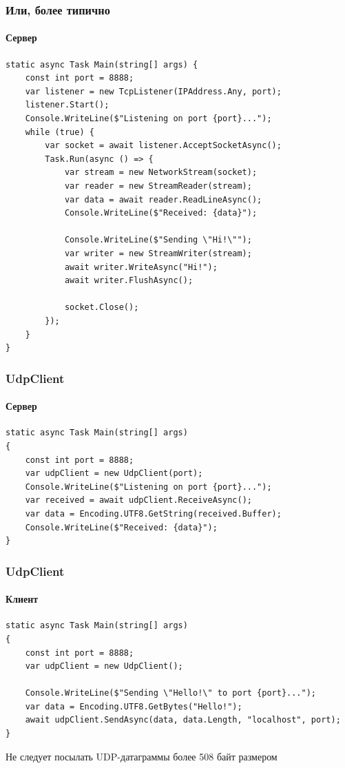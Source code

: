 \documentclass[xetex,mathserif,serif]{beamer}
\begin{document}
	\begin{frame}[fragile]
		\frametitle{Или, более типично}
		\framesubtitle{Сервер}
		\begin{scriptsize}
			\begin{verbatim}
static async Task Main(string[] args) {
    const int port = 8888;
    var listener = new TcpListener(IPAddress.Any, port);
    listener.Start();
    Console.WriteLine($"Listening on port {port}...");
    while (true) {
        var socket = await listener.AcceptSocketAsync();
        Task.Run(async () => {
            var stream = new NetworkStream(socket);
            var reader = new StreamReader(stream);
            var data = await reader.ReadLineAsync();
            Console.WriteLine($"Received: {data}");

            Console.WriteLine($"Sending \"Hi!\"");
            var writer = new StreamWriter(stream);
            await writer.WriteAsync("Hi!");
            await writer.FlushAsync();

            socket.Close();
        });
    }
}
			\end{verbatim}
		\end{scriptsize}
	\end{frame}

	\begin{frame}[fragile]
		\frametitle{UdpClient}
		\framesubtitle{Сервер}
		\begin{footnotesize}
			\begin{verbatim}
static async Task Main(string[] args)
{
    const int port = 8888;
    var udpClient = new UdpClient(port);
    Console.WriteLine($"Listening on port {port}...");
    var received = await udpClient.ReceiveAsync();
    var data = Encoding.UTF8.GetString(received.Buffer);
    Console.WriteLine($"Received: {data}");
}
			\end{verbatim}
		\end{footnotesize}
	\end{frame}

	\begin{frame}[fragile]
		\frametitle{UdpClient}
		\framesubtitle{Клиент}
		\begin{footnotesize}
			\begin{verbatim}
static async Task Main(string[] args)
{
    const int port = 8888;
    var udpClient = new UdpClient();

    Console.WriteLine($"Sending \"Hello!\" to port {port}...");
    var data = Encoding.UTF8.GetBytes("Hello!");
    await udpClient.SendAsync(data, data.Length, "localhost", port);
}
			\end{verbatim}
		\end{footnotesize}
		Не следует посылать UDP-датаграммы более 508 байт размером
	\end{frame}
\end{document}
